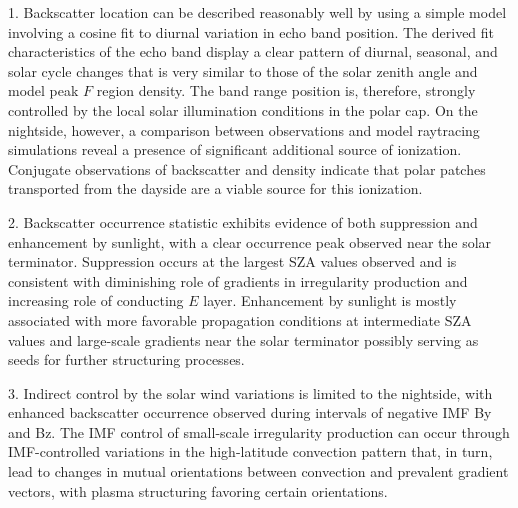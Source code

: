 1. Backscatter location can be described reasonably well by using a simple model involving a cosine fit to diurnal variation in echo band position. The derived fit characteristics of the echo band display a clear pattern of diurnal, seasonal, and solar cycle changes that is very similar to those of the solar zenith angle and model peak \(F\) region density. The band range position is, therefore, strongly controlled by the local solar illumination conditions in the polar cap. On the nightside, however, a comparison between observations and model raytracing simulations reveal a presence of significant additional source of ionization. Conjugate observations of backscatter and density indicate that polar patches transported from the dayside are a viable source for this ionization.

2. Backscatter occurrence statistic exhibits evidence of both suppression and enhancement by sunlight, with a clear occurrence peak observed near the solar terminator. Suppression occurs at the largest SZA values observed and is consistent with diminishing role of gradients in irregularity production and increasing role of conducting $E$ layer. Enhancement by sunlight is mostly associated with more favorable propagation conditions at intermediate SZA values and large-scale gradients near the solar terminator possibly serving as seeds for further structuring processes.

3. Indirect control by the solar wind variations is limited to the nightside, with enhanced backscatter occurrence observed during intervals of negative IMF By and Bz. The IMF control of small-scale irregularity production can occur through IMF-controlled variations in the high-latitude convection pattern that, in turn, lead to changes in mutual orientations between convection and prevalent gradient vectors, with plasma structuring favoring certain orientations.







